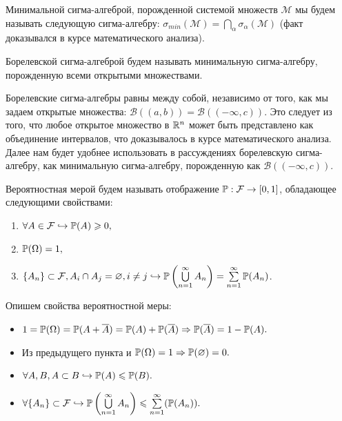 \begin{definition}
    Минимальной сигма-алгеброй, порожденной системой множеств $\mathcal{M}$ мы будем называть следующую сигма-алгебру: $\sigma_{min}(\mathcal{M}) = \bigcap\limits_{\alpha}\sigma_{\alpha}(\mathcal{M})$ (факт доказывался в курсе математического анализа). 
\end{definition}

\begin{definition}
    Борелевской сигма-алгеброй будем называть минимальную сигма-алгебру, порожденную всеми открытыми множествами. 
\end{definition}
\begin{remark}
    Борелевские сигма-алгебры равны между собой, независимо от того, как мы задаем открытые множества: $\mathcal{B}((a, b)) = \mathcal{B}((-\infty, c))$. Это следует из того, что любое открытое множество в $\R^n$ может быть представлено как объединение интервалов, что доказывалось в курсе математического анализа. 
    \noindent Далее нам будет удобнее использовать в рассуждениях борелевскую сигма-алгебру, как минимальную сигма-алгебру, порожденную как $\mathcal{B}((-\infty, c))$.
\end{remark}

\begin{definition}
    Вероятностная мерой будем называть отображение $\P : \mathcal{F} \to [0, 1]$, обладающее следующими свойствами: 
    \begin{enumerate}
        \item $\forall A \in \mathcal{F} \hookrightarrow \P(A) \ge 0,$
        \item $\P(\Omega) = 1, $
        \item $\{A_n\} \subset \mathcal{F}, A_i \cap A_j = \varnothing, i \neq j \hookrightarrow \P\left(\bigcup\limits_{n = 1}^{\infty} A_n \right) = \sum\limits_{n = 1}^{\infty}\P(A_n)$.
    \end{enumerate}
\end{definition}

\noindent Опишем свойства вероятностной меры: 

\begin{itemize}
    \item $1 = \P(\Omega) = \P(A + \overline{A}) = \P(A) + \P(\overline{A}) \Rightarrow \P(\overline{A}) = 1 - \P(A).$
\end{itemize}

\begin{itemize}
    \item Из предыдущего пункта и $\P(\Omega) = 1 \Rightarrow \P(\varnothing) = 0.$
    \item $\forall A, B, A \subset B \hookrightarrow \P(A) \le \P(B).$
    \item $\forall \{A_n\} \subset \mathcal{F} \hookrightarrow \P\left(\bigcup\limits_{n = 1}^{\infty} A_n\right) \le \sum\limits_{n = 1}^{\infty}(\P(A_n)).$
\end{itemize}


